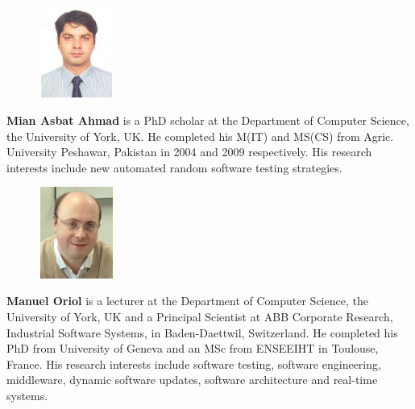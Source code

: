 \documentclass[conference]{IEEEtran}
\begin{document}
\begin{figure}
\vspace{-3pt}
\includegraphics[width=2.5cm,height=3cm]{mian.jpg}
\end{figure}
\noindent\textbf{Mian Asbat Ahmad} is a PhD scholar at the Department of Computer Science, the University of York, UK. He completed his M(IT) and MS(CS) from Agric. University Peshawar, Pakistan in 2004 and 2009 respectively. His research interests include new automated random software testing strategies.
\bigskip
\bigskip
\begin{figure}
\vspace{-4pt}
\includegraphics[width=2.5cm,height=3cm]{manuel.jpg}
\end{figure}

\textbf{Manuel Oriol} is a lecturer at the Department of Computer Science, the University of York, UK and a Principal Scientist at ABB Corporate Research, Industrial Software Systems, in Baden-Daettwil, Switzerland. He completed his PhD from University of Geneva and an MSc from ENSEEIHT in Toulouse, France. His research interests include software testing, software engineering, middleware, dynamic software updates, software architecture and real-time systems.
\end{document}
